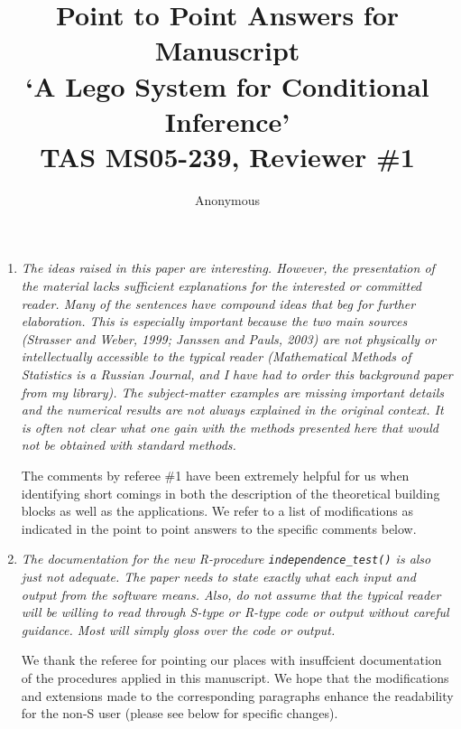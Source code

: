 \documentclass[11pt]{article}
\begin{document}
\title{Point to Point Answers for Manuscript \\
`A Lego System for Conditional Inference' \\
TAS MS05-239, Reviewer \#1}
\author{Anonymous}
\maketitle

\begin{enumerate}
\item \textsl{The ideas raised in this paper are interesting. However, the presentation of the 
              material lacks sufficient explanations for the interested or committed reader. 
              Many of the sentences have compound ideas that beg for further elaboration. 
              This is especially important because the two main sources (Strasser and Weber, 1999; 
              Janssen and Pauls, 2003) are not physically or intellectually accessible to the 
              typical reader (Mathematical Methods of Statistics is a Russian Journal, and I have 
              had to order this background paper from my library). The subject-matter examples are 
              missing important details and the numerical results are not always explained in the 
              original context. It is often not clear what one gain with the methods presented here 
              that would not be obtained with standard methods.}

The comments by referee \#1 have been extremely helpful for us when
identifying short comings in both the description of the theoretical
building blocks as well as the applications. We refer to a list of modifications
as indicated in the point to point answers to the specific comments below.

\item \textsl{The documentation for the new R-procedure \texttt{independence\_test()} is also just not 
              adequate. The paper needs to state exactly what each input and output from the 
              software means. Also, do not assume that the typical reader will be willing to 
              read through S-type or R-type code or output without careful guidance. Most will 
              simply gloss over the code or output.}

We thank the referee for pointing our places with insuffcient documentation
of the procedures applied in this manuscript. We hope that the modifications
and extensions made to the corresponding paragraphs enhance the readability
for the non-\textsf{S} user (please see below for specific
changes).


\end{enumerate}
\end{document}
